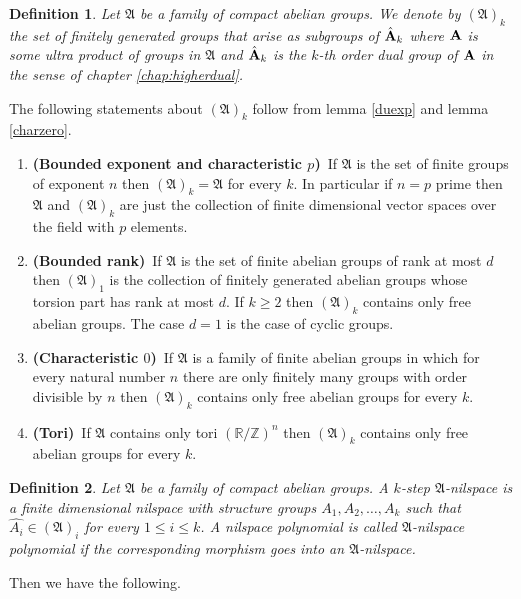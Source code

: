 \documentclass [11pt] {article}
\newtheorem{definition}{Definition}[section]
\def\bA{{\bf A}}
\begin{document}
\begin{definition} Let $\mathfrak{A}$ be a family of compact abelian groups. We denote by $(\mathfrak{A})_k$ the set of finitely generated groups that arise as subgroups of $\hat{\bA}_k$ where $\bA$ is some ultra product of groups in $\mathfrak{A}$ and $\hat{\bA}_k$ is the $k$-th order dual group of $\bA$ in the sense of chapter \ref{chap:higherdual}. 
\end{definition}

The following statements about $(\mathfrak{A})_k$ follow from lemma \ref{duexp} and lemma \ref{charzero}.

\begin{enumerate}
\item {\bf (Bounded exponent and characteristic $p$)}~If $\mathfrak{A}$ is the set of finite groups of exponent $n$ then $(\mathfrak{A})_k=\mathfrak{A}$ for every $k$. In particular if $n=p$ prime then $\mathfrak{A}$ and $(\mathfrak{A})_k$ are just the collection of finite dimensional vector spaces over the field with $p$ elements.
\item {\bf (Bounded rank)}~If $\mathfrak{A}$ is the set of finite abelian groups of rank at most $d$ then $(\mathfrak{A})_1$ is the collection of finitely generated abelian groups whose torsion part has rank at most $d$. If $k\geq 2$ then $(\mathfrak{A})_k$ contains only free abelian groups. The case $d=1$ is the case of cyclic groups.
\item {\bf (Characteristic $0$)}~If $\mathfrak{A}$ is a family of finite abelian groups in which for every natural number $n$ there are only finitely many groups with order divisible by $n$ then $(\mathfrak{A})_k$ contains only free abelian groups for every $k$.
\item {\bf (Tori)}~If $\mathfrak{A}$ contains only tori $(\mathbb{R}/\mathbb{Z})^n$ then $(\mathfrak{A})_k$ contains only free abelian groups for every $k$.
\end{enumerate} 

\begin{definition} Let $\mathfrak{A}$ be a family of compact abelian groups. A $k$-step $\mathfrak{A}$-nilspace is a finite dimensional nilspace with structure groups $A_1,A_2,\dots,A_k$ such that $\hat{A_i}\in(\mathfrak{A})_i$ for every $1\leq i\leq k$.
A nilspace polynomial is called $\mathfrak{A}$-nilspace polynomial if the corresponding morphism goes into an $\mathfrak{A}$-nilspace.\end{definition}
Then we have the following.
\end{document}
